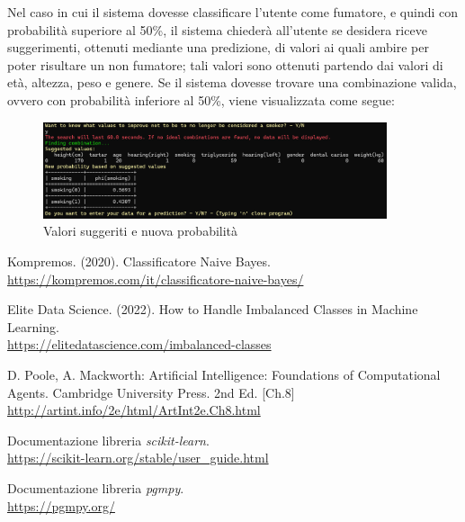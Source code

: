\documentclass{article}
\begin{document}
\noindent
Nel caso in cui il sistema dovesse classificare l'utente come fumatore, e quindi con probabilità superiore al 50\%, il sistema chiederà all'utente se desidera riceve suggerimenti, ottenuti mediante una predizione, di valori ai quali ambire per poter risultare un non fumatore; tali valori sono ottenuti partendo dai valori di età, altezza, peso e genere.
Se il sistema dovesse trovare una combinazione valida, ovvero con probabilità inferiore al 50\%, viene visualizzata come segue:

\begin{figure}[H]
        \includegraphics[width=0.9\textwidth]{search}
        \centering
        \caption{Valori suggeriti e nuova probabilità}
        \centering
\end{figure}

\newpage
\begin{thebibliography}{5}
        Kompremos. (2020). Classificatore Naive Bayes. 
        \\\url{https://kompremos.com/it/classificatore-naive-bayes/} 
        
        Elite Data Science. (2022). How to Handle Imbalanced Classes in Machine Learning. 
        \\\url{https://elitedatascience.com/imbalanced-classes} 
        
        D. Poole, A. Mackworth: Artificial Intelligence: Foundations of Computational
        Agents. Cambridge University Press. 2nd Ed. [Ch.8]
        \\\url{http://artint.info/2e/html/ArtInt2e.Ch8.html} 
        
        Documentazione libreria \textit{scikit-learn}.
        \\\url{https://scikit-learn.org/stable/user_guide.html} 
        
        Documentazione libreria \textit{pgmpy}.
        \\\url{https://pgmpy.org/} 
        
        
        \end{thebibliography}
\end{document}
